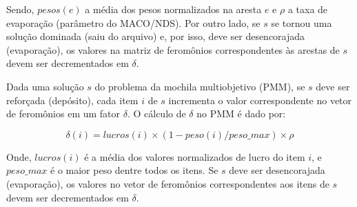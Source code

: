 Sendo, $pesos(e)$ a média dos pesos normalizados na aresta $e$ e $\rho$ a taxa de evaporação (parâmetro do MACO/NDS). Por outro lado, se $s$ se tornou uma solução dominada (saiu do arquivo) e, por isso, deve ser desencorajada (evaporação), os valores na matriz de feromônios correspondentes às arestas de $s$ devem ser decrementados em $\delta$.

Dada uma solução $s$ do problema da mochila multiobjetivo (PMM), se $s$ deve ser reforçada (depósito), cada item $i$ de $s$ incrementa o valor correspondente no vetor de feromônios em um fator $\delta$. O cálculo de $\delta$ no PMM é dado por:

\begin{equation}\delta(i) = lucros(i) \times (1 - peso(i) / peso\_{max}) \times \rho\end{equation}

Onde, $lucros(i)$ é a média dos valores normalizados de lucro do item $i$, e $peso\_{max}$ é o maior peso dentre todos os itens. Se $s$ deve ser desencorajada (evaporação), os valores no vetor de feromônios correspondentes aos itens de $s$ devem ser decrementados em $\delta$.